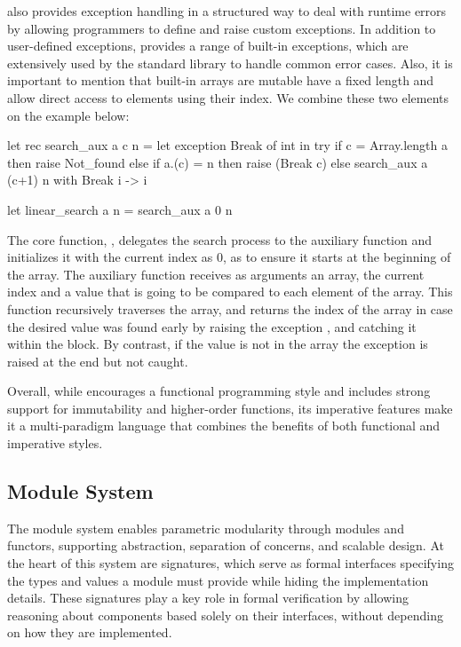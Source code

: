 \ocaml also provides exception handling in a structured way to deal with runtime errors by allowing programmers to define 
and raise custom exceptions. In addition to user-defined exceptions, \ocaml provides a range of built-in exceptions, which are 
extensively used by the standard library to handle common error cases. Also, it is important to mention that built-in arrays are mutable
have a fixed length and allow direct access to elements using their index. We combine these two elements on the example below:

\begin{ocamlenv}
let rec search_aux a c n =
  let exception Break of int in try
    if c = Array.length a then raise Not_found 
    else if a.(c) = n then raise (Break c) 
    else search_aux a (c+1) n
  with Break i -> i

let linear_search a n = search_aux a 0 n
\end{ocamlenv}

The core function, , delegates the search process to the auxiliary function and initializes it with the current
index as 0, as to ensure it starts at the beginning of the array. The auxiliary function  receives as arguments 
an array, the current index and a value that is going to be 
compared to each element of the array. This function recursively traverses the array, and returns the index of the array in case the desired 
value was found early by raising the exception , and catching it within the  block. By contrast, 
if the value is not in the array the exception  is raised at the end but not caught.

Overall, while \ocaml encourages a functional programming style and includes strong support for immutability and higher-order functions, 
its imperative features make it a multi-paradigm language that combines the benefits of both functional and imperative styles.

\subsection{Module System}

The module system enables parametric modularity through modules and functors, supporting abstraction, separation of concerns, and 
scalable design. At the heart of this system are signatures, which serve as formal interfaces specifying the types and values a 
module must provide while hiding the implementation details. These signatures play a key role in formal verification by allowing 
reasoning about components based solely on their interfaces, without depending on how they are implemented.

